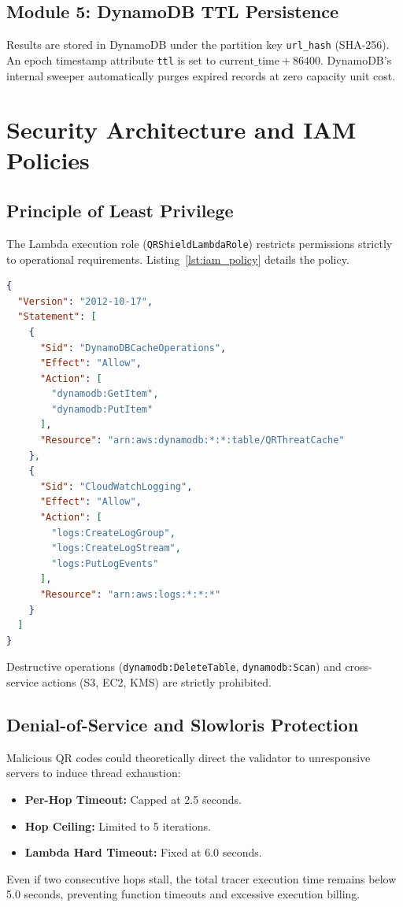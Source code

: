 \documentclass[12pt,a4paper]{report}
\begin{document}
\section{Module 5: DynamoDB TTL Persistence}
Results are stored in DynamoDB under the partition key \texttt{url\_hash} (SHA-256). An epoch timestamp attribute \texttt{ttl} is set to $\text{current\_time} + 86400$. DynamoDB's internal sweeper automatically purges expired records at zero capacity unit cost.

\chapter{Security Architecture and IAM Policies}

\section{Principle of Least Privilege}
The Lambda execution role (\texttt{QRShieldLambdaRole}) restricts permissions strictly to operational requirements. Listing~\ref{lst:iam_policy} details the policy.

\begin{lstlisting}[language=json,caption={Execution IAM Policy (execution-policy.json)},label={lst:iam_policy}]
{
  "Version": "2012-10-17",
  "Statement": [
    {
      "Sid": "DynamoDBCacheOperations",
      "Effect": "Allow",
      "Action": [
        "dynamodb:GetItem",
        "dynamodb:PutItem"
      ],
      "Resource": "arn:aws:dynamodb:*:*:table/QRThreatCache"
    },
    {
      "Sid": "CloudWatchLogging",
      "Effect": "Allow",
      "Action": [
        "logs:CreateLogGroup",
        "logs:CreateLogStream",
        "logs:PutLogEvents"
      ],
      "Resource": "arn:aws:logs:*:*:*"
    }
  ]
}
\end{lstlisting}

Destructive operations (\texttt{dynamodb:DeleteTable}, \texttt{dynamodb:Scan}) and cross-service actions (S3, EC2, KMS) are strictly prohibited.

\section{Denial-of-Service and Slowloris Protection}
Malicious QR codes could theoretically direct the validator to unresponsive servers to induce thread exhaustion:
\begin{itemize}
    \item \textbf{Per-Hop Timeout:} Capped at 2.5 seconds.
    \item \textbf{Hop Ceiling:} Limited to 5 iterations.
    \item \textbf{Lambda Hard Timeout:} Fixed at 6.0 seconds.
\end{itemize}
Even if two consecutive hops stall, the total tracer execution time remains below 5.0 seconds, preventing function timeouts and excessive execution billing.
\end{document}
